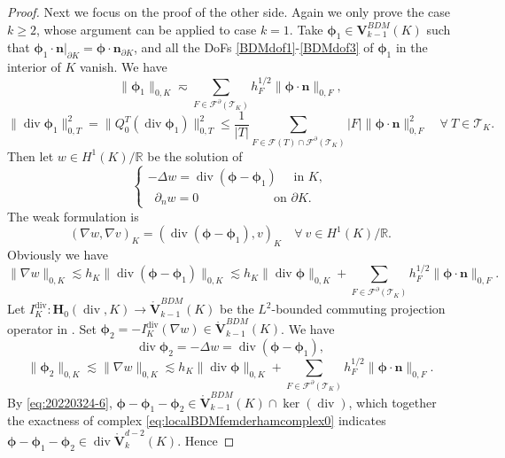 \documentclass[10pt]{amsart}
\renewcommand{\div}{\operatorname{div}}
\numberwithin{equation}{section}
\begin{document}
\begin{proof}
Next we focus on the proof of the other side. Again we only prove the case $k\geq2$, whose argument can be applied to case $k=1$. Take $\boldsymbol{\phi}_1\in\boldsymbol{V}_{k-1}^{BDM}(K)$ such that $\boldsymbol{\phi}_1\cdot\boldsymbol{n}|_{\partial K}=\boldsymbol{\phi}\cdot\boldsymbol{n}_{\partial K}$, and all the DoFs \eqref{BDMdof1}-\eqref{BDMdof3} of $\boldsymbol{\phi}_1$ in the interior of $K$ vanish. We have
\begin{equation}\label{eq:20220324-5}
\|\boldsymbol{\phi}_1\|_{0,K}\eqsim \sum_{F\in\mathcal F^{\partial}(\mathcal T_K)}h_F^{1/2}\|\boldsymbol{\phi}\cdot\boldsymbol{n}\|_{0,F},
\end{equation}
$$
\|\div\boldsymbol{\phi}_1\|_{0,T}^2=\|Q_0^T(\div\boldsymbol{\phi}_1)\|_{0,T}^2
\leq\frac{1}{|T|}\sum_{F\in\mathcal F(T)\cap\mathcal F^{\partial}(\mathcal T_K)}|F|\|\boldsymbol{\phi}\cdot\boldsymbol{n}\|_{0,F}^2\quad\forall~T\in\mathcal T_K.
$$
Then let $w\in H^1(K)/\mathbb R$ be the solution of 
$$
\begin{cases}
-\Delta w= \div(\boldsymbol{\phi}-\boldsymbol{\phi}_1)\quad\textrm{ in } K, \\
\;\;\partial_nw=0\qquad\qquad\quad\;\;\,\textrm{ on } \partial K.
\end{cases}
$$
The weak formulation is
$$
(\nabla w, \nabla v)_K=(\div(\boldsymbol{\phi}-\boldsymbol{\phi}_1), v)_K\quad\forall~v\in H^1(K)/\mathbb R.
$$
Obviously we have
$$
\|\nabla w\|_{0,K}\lesssim h_K\|\div(\boldsymbol{\phi}-\boldsymbol{\phi}_1)\|_{0,K}\lesssim h_K\|\div\boldsymbol{\phi}\|_{0,K} +\sum_{F\in\mathcal F^{\partial}(\mathcal T_K)}h_F^{1/2}\|\boldsymbol{\phi}\cdot\boldsymbol{n}\|_{0,F}.
$$
Let $I_K^{\div}: \boldsymbol{H}_0(\div,K)\to\mathring{\boldsymbol{V}}_{k-1}^{BDM}(K)$ be the $L^2$-bounded commuting projection operator in \cite{ChristiansenWinther2008}. Set $\boldsymbol{\phi}_2=-I_K^{\div}(\nabla w)\in\mathring{\boldsymbol{V}}_{k-1}^{BDM}(K)$. We have
\begin{equation}\label{eq:20220324-6}
\div\boldsymbol{\phi}_2=-\Delta w=\div(\boldsymbol{\phi}-\boldsymbol{\phi}_1),
\end{equation}
\begin{equation}\label{eq:20220324-7}
\|\boldsymbol{\phi}_2\|_{0,K}\lesssim \|\nabla w\|_{0,K}\lesssim h_K\|\div\boldsymbol{\phi}\|_{0,K} +\sum_{F\in\mathcal F^{\partial}(\mathcal T_K)}h_F^{1/2}\|\boldsymbol{\phi}\cdot\boldsymbol{n}\|_{0,F}.
\end{equation}
By \eqref{eq:20220324-6}, $\boldsymbol{\phi}-\boldsymbol{\phi}_1-\boldsymbol{\phi}_2\in\mathring{\boldsymbol{V}}_{k-1}^{BDM}(K)\cap\ker(\div)$, which together the exactness of complex \eqref{eq:localBDMfemderhamcomplex0} indicates $\boldsymbol{\phi}-\boldsymbol{\phi}_1-\boldsymbol{\phi}_2\in\div\mathring{\boldsymbol{V}}_{k}^{d-2}(K)$. Hence

\end{proof}
\end{document}
